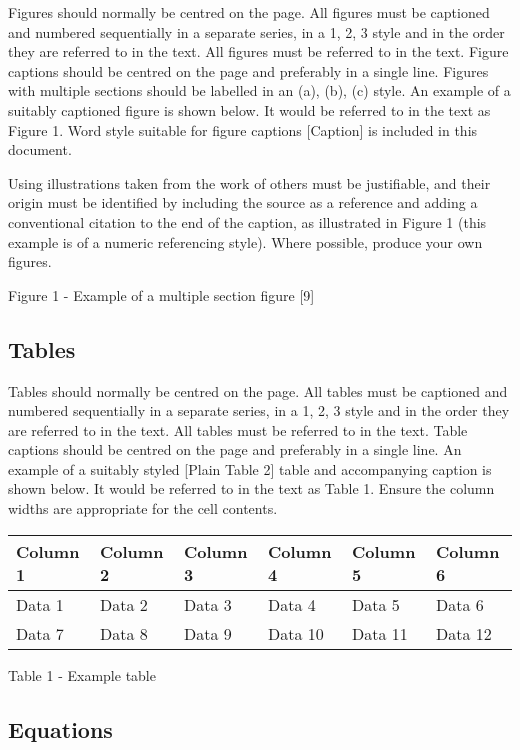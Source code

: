 \documentclass[12pt]{article}
\begin{document}
Figures should normally be centred on the page. All figures must be
captioned and numbered sequentially in a separate series, in a 1, 2, 3
style and in the order they are referred to in the text. All figures
must be referred to in the text. Figure captions should be centred on
the page and preferably in a single line. Figures with multiple sections
should be labelled in an (a), (b), (c) style. An example of a suitably
captioned figure is shown below. It would be referred to in the text as
Figure 1. Word style suitable for figure captions {[}Caption{]} is
included in this document.

Using illustrations taken from the work of others must be justifiable,
and their origin must be identified by including the source as a
reference and adding a conventional citation to the end of the caption,
as illustrated in Figure 1 (this example is of a numeric referencing
style). Where possible, produce your own figures.

Figure 1 - Example of a multiple section figure {[}9{]}

\hypertarget{tables}{%
\subsection{Tables}\label{tables}}

Tables should normally be centred on the page. All tables must be
captioned and numbered sequentially in a separate series, in a 1, 2, 3
style and in the order they are referred to in the text. All tables must
be referred to in the text. Table captions should be centred on the page
and preferably in a single line. An example of a suitably styled
{[}Plain Table 2{]} table and accompanying caption is shown below. It
would be referred to in the text as Table 1. Ensure the column widths
are appropriate for the cell contents.

\begin{longtable}[]{@{}llllll@{}}
\toprule
Column 1 & Column 2 & Column 3 & Column 4 & Column 5 & Column
6\tabularnewline
\midrule
\endhead
Data 1 & Data 2 & Data 3 & Data 4 & Data 5 & Data 6\tabularnewline
Data 7 & Data 8 & Data 9 & Data 10 & Data 11 & Data 12\tabularnewline
\bottomrule
\end{longtable}

Table 1 - Example table

\hypertarget{equations}{%
\subsection{Equations}\label{equations}}
\end{document}

